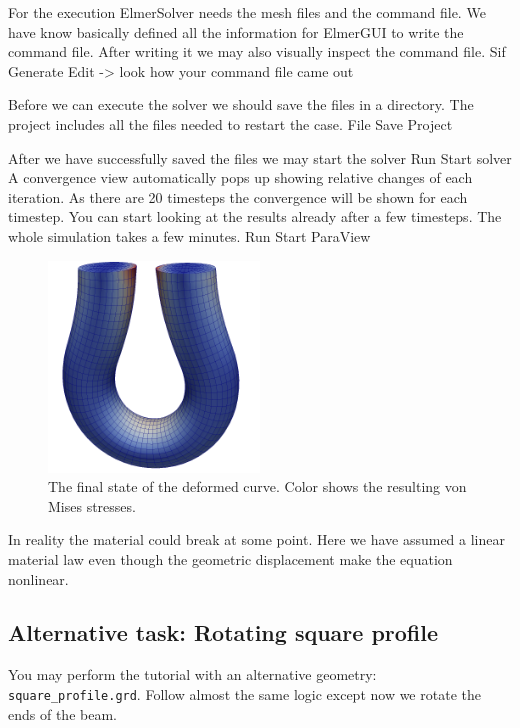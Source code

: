 For the execution 
ElmerSolver needs the mesh files and the command file. We have know basically defined
all the information for ElmerGUI to write the command file. After writing it we may also visually 
inspect the command file.
\ttbegin
Sif 
  Generate
  Edit -> look how your command file came out  
\ttend

Before we can execute the solver we should save the files in a directory. The project includes
all the files needed to restart the case.
\ttbegin
File 
  Save Project
\ttend

After we have successfully saved the files we may start the solver
\ttbegin
Run
  Start solver
\ttend
A convergence view automatically pops up showing relative changes of each iteration.
As there are 20 timesteps the convergence will be shown for each timestep.
You can start looking at the results already after a few timesteps. The whole simulation
takes a few minutes. 
\ttbegin
Run
  Start ParaView
\ttend


\begin{figure}[h!]
\begin{center}
  \includegraphics[width=0.5\textwidth]{UturnVonMisesStressMesh}
  \caption{The final state of the deformed curve. Color shows the resulting von Mises stresses.}
  \label{fig:UturnVonMisesStress}
\end{center}
\end{figure}

In reality the material could break at some point. Here we have assumed a linear material law
even though the geometric displacement make the equation nonlinear. 


\subsection*{Alternative task: Rotating square profile}

You may perform the tutorial with an alternative geometry: \texttt{square\_profile.grd}.
Follow almost the same logic except now we rotate the ends of the beam.

